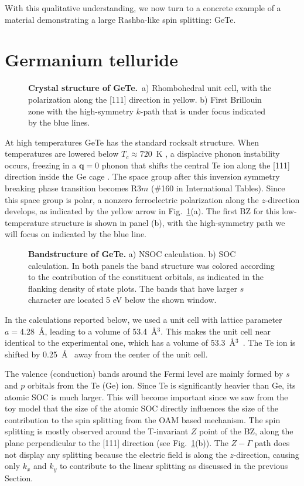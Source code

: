 With this qualitative understanding, we now turn to a concrete example of a material demonstrating a large Rashba-like spin splitting: GeTe.

\section{Germanium telluride}
\begin{figure}[h]
\caption{\label{fig:Rashba_crystal}{\bf Crystal structure of GeTe.}~a) Rhombohedral unit cell, with the polarization along the [111] direction in yellow. b) First Brillouin zone with the high-symmetry $k$-path that is under focus indicated by the blue lines.}
\end{figure}
At high temperatures GeTe has the standard rocksalt structure.
When temperatures are lowered below $T_c \approx 720$~K \cite{DiSante2013}, a displacive phonon instability occurs, freezing in a $\bm{q} = 0$ phonon that shifts the central Te ion along the [111] direction inside the Ge cage \cite{Rabe1987}.
The space group after this inversion symmetry breaking phase transition becomes R$3m$ (\#160 in International Tables).
Since this space group is polar, a nonzero ferroelectric polarization along the $z$-direction develops, as indicated by the yellow arrow in Fig.~\ref{fig:Rashba_crystal}(a).
The first \gls{BZ} for this low-temperature structure is shown in panel (b), with the high-symmetry path we will focus on indicated by the blue line.

\begin{figure}[h!]
\caption{\label{fig:Rashba_bands_dos}{\bf Bandstructure of GeTe.} a) \gls{NSOC} calculation. b) \gls{SOC} calculation. In both panels the band structure was colored according to the contribution of the constituent orbitals, as indicated in the flanking density of state plots. The bands that have larger $s$ character are located 5 eV below the shown window.}
\end{figure}
In the calculations reported below, we used a unit cell with lattice parameter $a=$4.28~\AA, leading to a volume of 53.4~\AA$^3$.
This makes the unit cell near identical to the experimental one, which has a volume of 53.3~\AA$^3$~\cite{Serebryanaya1995}.
The Te ion is shifted by 0.25~\AA~ away from the center of the unit cell.

The valence (conduction) bands around the Fermi level are mainly formed by $s$ and $p$ orbitals from the Te (Ge) ion.
Since Te is significantly heavier than Ge, its atomic \gls{SOC} is much larger. This will become important since we saw from the toy model that the size of the atomic \gls{SOC} directly influences the size of the contribution to the spin splitting from the \gls{OAM} based mechanism.
The spin splitting is mostly observed around the \gls{T}-invariant $Z$ point of the \gls{BZ}, along the plane perpendicular to the [111] direction (see Fig.~\ref{fig:Rashba_crystal}(b)).
The $Z-\Gamma$ path does not display any splitting because the electric field is along the $z$-direction, causing only  $k_x$ and $k_y$ to contribute to the linear splitting as discussed in the previous Section.

